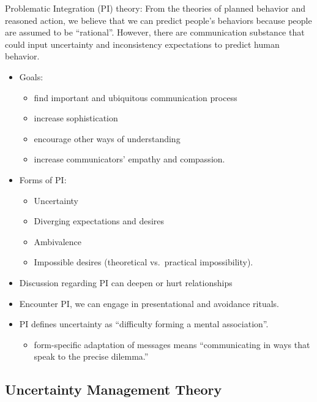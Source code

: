 \documentclass[
]{book}
\providecommand{\tightlist}{%
  \setlength{\itemsep}{0pt}\setlength{\parskip}{0pt}}
\begin{document}
Problematic Integration (PI) theory: From the theories of planned behavior and reasoned action, we believe that we can
predict people's behaviors because people are assumed to be ``rational''. However, there are communication substance that
could input uncertainty and inconsistency expectations to predict human behavior.

\begin{itemize}
\item
  Goals:

  \begin{itemize}
  \tightlist
  \item
    find important and ubiquitous communication process
  \item
    increase sophistication
  \item
    encourage other ways of understanding
  \item
    increase communicators' empathy and compassion.
  \end{itemize}
\item
  Forms of PI:

  \begin{itemize}
  \tightlist
  \item
    Uncertainty
  \item
    Diverging expectations and desires
  \item
    Ambivalence
  \item
    Impossible desires (theoretical vs.~practical impossibility).
  \end{itemize}
\item
  Discussion regarding PI can deepen or hurt relationships
\item
  Encounter PI, we can engage in presentational and avoidance rituals.
\item
  PI defines uncertainty as ``difficulty forming a mental association''. \citep{Babrow_2009}

  \begin{itemize}
  \tightlist
  \item
    form-specific adaptation of messages means ``communicating in ways that speak to the precise dilemma.''
    \citep{Babrow_2009}
  \end{itemize}
\end{itemize}

\hypertarget{uncertainty-management-theory}{%
\subsection{Uncertainty Management Theory}\label{uncertainty-management-theory}}
\end{document}
